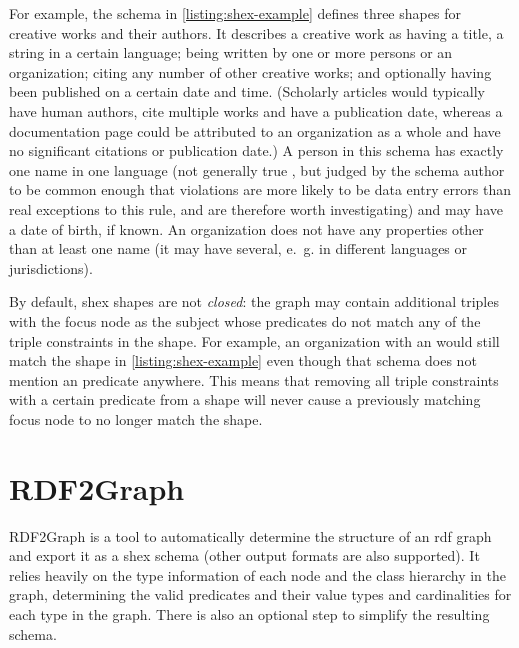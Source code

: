 For example, the schema in \cref{listing:shex-example} defines three \glspl{shape}
for creative works and their authors.
It describes a creative work as having a title, a string in a certain language;
being written by one or more persons or an organization;
citing any number of other creative works;
and optionally having been published on a certain date and time.
(Scholarly articles would typically have human authors,
cite multiple works and have a publication date,
whereas a documentation page could be attributed to an organization as a whole
and have no significant citations or publication date.)
A person in this \gls{schema} has exactly one name in one language
(not generally true \cite{falsehoods-programmers-believe-about-names},
but judged by the schema author to be common enough
that violations are more likely to be data entry errors than real exceptions to this rule,
and are therefore worth investigating)
and may have a date of birth, if known.
An organization does not have any properties other than at least one name
(it may have several, e.~g. in different languages or jurisdictions).


By default, \gls{shex} \glspl{shape} are not \emph{closed}:
the graph may contain additional \glspl{triple} with the \gls{focus node} as the \gls{subject}
whose \glspl{predicate} do not match any of the \glspl{triple constraint} in the \gls{shape}.
For example, an organization with an  would still match the  shape in \cref{listing:shex-example}
even though that \gls{schema} does not mention an  \gls{predicate} anywhere.
This means that removing all \glspl{triple constraint} with a certain \gls{predicate} from a \gls{shape}
will never cause a previously matching \gls{focus node} to no longer match the \gls{shape}.

\section{\gls{RDF2Graph}}
\label{sec:Background:RDF2Graph}

\gls{RDF2Graph} \cite{vanDam2015}
is a tool to automatically determine the structure of an \gls{rdf} graph
and export it as a \gls{shex} \gls{schema}
(other output formats are also supported).
It relies heavily on the type information of each node and the class hierarchy in the graph,
determining the valid \glspl{predicate} and their value types and cardinalities for each type in the graph.
There is also an optional step to simplify the resulting \gls{schema}.

